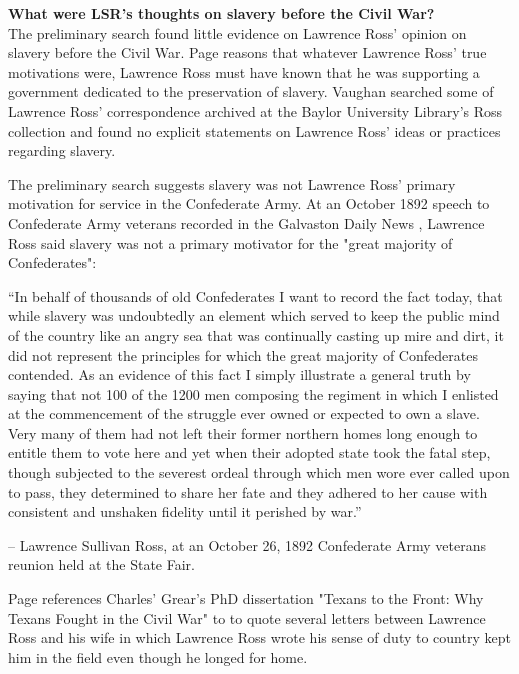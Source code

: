 \documentclass[12pt]{article}
\begin{document}
\textbf{What were LSR's thoughts on slavery before the Civil War? \\ }
The preliminary search found little evidence on Lawrence Ross' opinion on slavery before the Civil War. Page \cite[pg. 59]{page} reasons that whatever Lawrence Ross' true motivations were, Lawrence Ross must have known that he was supporting a government dedicated to the preservation of slavery. Vaughan \cite{vaughan:email} searched some of Lawrence Ross' correspondence archived at the Baylor University Library's Ross collection and found no explicit statements on Lawrence Ross' ideas or practices regarding slavery. 

The preliminary search suggests slavery was not Lawrence Ross' primary motivation for service in the Confederate Army. At an October 1892 speech to Confederate Army veterans recorded in the Galvaston Daily News \cite{galvastondaily}, Lawrence Ross said slavery was not a primary motivator for the "great majority of Confederates":

\begin{displayquote}
“In behalf of thousands of old Confederates I want to record the fact today, that while slavery was undoubtedly an element which served to keep the public mind of the country like an angry sea that was continually casting up mire and dirt, it did not represent the principles for which the great majority of Confederates contended.  As an evidence of this fact I simply illustrate a general truth by saying that not 100 of the 1200 men composing the regiment in which I enlisted at the commencement of the struggle ever owned or expected to own a slave.  Very many of them had not left their former northern homes long enough to entitle them to vote here and yet when their adopted state took the fatal step, though subjected to the severest ordeal through which men wore ever called upon to pass, they determined to share her fate and they adhered to her cause with consistent and unshaken fidelity until it perished by war.” 

-- Lawrence Sullivan Ross, at an October 26, 1892 Confederate Army veterans reunion held at the State Fair.
\end{displayquote}

Page \cite[pg. 59--60]{page} references Charles' Grear's PhD dissertation "Texans to the Front: Why Texans Fought in the Civil War" to to quote several letters between Lawrence Ross and his wife in which Lawrence Ross wrote his sense of duty to country kept him in the field even though he longed for home. 
\end{document}
